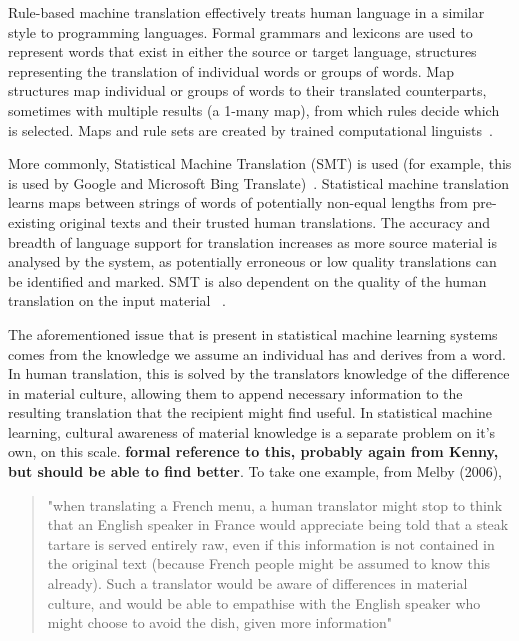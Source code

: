 \documentclass{article}
\begin{document}
Rule-based machine translation effectively treats human language in a similar style to programming languages.  Formal grammars and lexicons are used to represent words that exist in either the source or target language, structures representing the translation of individual words or groups of words.  Map structures map individual or groups of words to their translated counterparts, sometimes with multiple results (a 1-many map), from which rules decide which is selected.  Maps and rule sets are created by trained computational linguists~\cite{kenny2011ethics}.

More commonly, Statistical Machine Translation (SMT) is used (for example, this is used by Google and Microsoft Bing Translate)~\cite{kenny2011ethics, Google_Translate_Research}.  Statistical machine translation learns maps between strings of words of potentially non-equal lengths from pre-existing original texts and their trusted human translations.  The accuracy and breadth of language support for translation increases as more source material is analysed by the system, as potentially erroneous or low quality translations can be identified and marked.  SMT is also dependent on the quality of the human translation on the input material ~\cite{kenny2011ethics}.

The aforementioned issue that is present in statistical machine learning systems comes from the knowledge we assume an individual has and derives from a word.  In human translation, this is solved by the translators knowledge of the difference in material culture, allowing them to append necessary information to the resulting translation that the recipient might find useful.  In statistical machine learning, cultural awareness of material knowledge is a separate problem on it's own, on this scale.  {\bf formal reference to this, probably again from Kenny, but should be able to find better}.  To take one example, from Melby (2006),

\blockquote{"when translating a French menu, a human translator might stop to think that an English speaker in France would appreciate being told that a steak tartare is served entirely raw, even if this information is not contained in the original text (because French people might be assumed to know this already). Such a translator would be aware of differences in material culture, and would be able to empathise with the English speaker who might choose to avoid the dish, given more information"~\cite{melby2006can, kenny2011ethics}}
\end{document}
